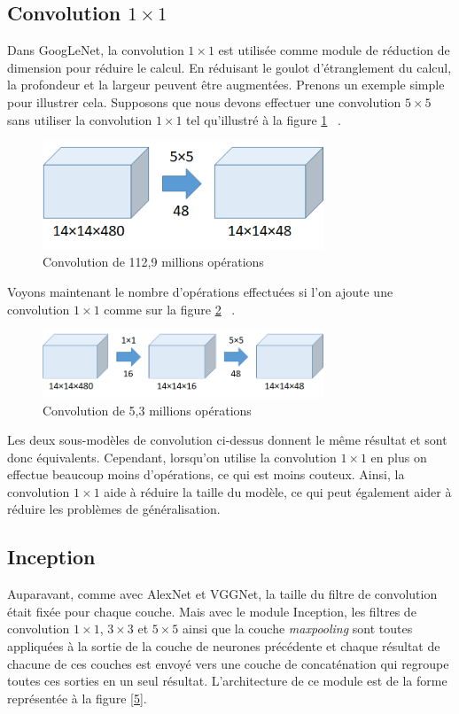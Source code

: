 \documentclass{article}
\begin{document}
\subsection{Convolution $1\times 1$}
Dans GoogLeNet, la convolution $1\times 1$ est utilisée comme module de
réduction de dimension pour réduire le calcul. En réduisant le goulot
d'étranglement du calcul, la profondeur et la largeur peuvent être augmentées.
Prenons un exemple simple pour illustrer cela. Supposons que nous devons
effectuer une convolution $5\times 5$ sans utiliser la convolution $1\times 1$
tel qu'illustré à la figure \ref{3} ~\cite{tsang_2018}.

\begin{figure}[htbp]
    \includegraphics[width=8.4cm]{./figures/Figure2.png} 
    \caption{Convolution de 112,9 millions opérations}
    \label{3} 
\end{figure} 

Voyons maintenant le nombre d’opérations effectuées si l’on ajoute une
convolution $1\times 1$ comme sur la figure \ref{4} ~\cite{tsang_2018}.

\begin{figure}[htbp]
    \includegraphics[width=8.4cm]{./figures/Figure3.png} 
    \caption{Convolution de 5,3 millions opérations}
    \label{4} 
\end{figure} 

Les deux sous-modèles de convolution ci-dessus donnent le même résultat et sont
donc équivalents. Cependant, lorsqu’on utilise la convolution $1\times 1$ en
plus on effectue beaucoup moins d’opérations, ce qui est moins couteux. Ainsi,
la convolution $1\times 1$ aide à réduire la taille du modèle, ce qui peut
également aider à réduire les problèmes de généralisation.

\subsection{Inception}
Auparavant, comme avec AlexNet et VGGNet, la taille du filtre de convolution
était fixée pour chaque couche. Mais avec le module Inception, les filtres de
convolution $1\times 1$,  $3\times 3$ et  $5\times 5$ ainsi que la couche
\textit{maxpooling} sont toutes appliquées à la sortie de la couche de neurones
précédente et chaque résultat de chacune de ces couches est envoyé vers une
couche de concaténation qui regroupe toutes ces sorties en un seul résultat.
L’architecture de ce module est de la forme représentée à la figure \ref{5}.
 ~\cite{43022}
\end{document}
